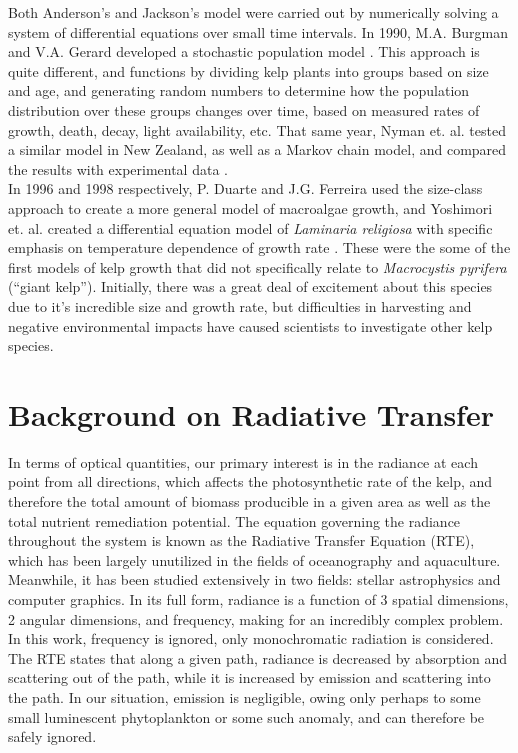 Both Anderson's and Jackson's model were carried out by numerically solving a system of differential equations over small time intervals.
In 1990, M.A. Burgman and V.A. Gerard developed a stochastic population model \cite{burgman_stage-structured_1990}.
This approach is quite different, and functions by dividing kelp plants into groups based on size and age, and generating random numbers to determine how the population distribution over these groups changes over time, based on measured rates of growth, death, decay, light availability, etc.
That same year, Nyman et. al. tested a similar model in New Zealand, as well as a Markov chain model, and compared the results with experimental data \cite{nyman_macrocystis_1990}. \\[-0.75em]

In 1996 and 1998 respectively, P. Duarte and J.G. Ferreira used the size-class approach to create a more general model of macroalgae growth, and Yoshimori et. al. created a differential equation model of \textit{Laminaria religiosa} with specific emphasis on temperature dependence of growth rate \cite{duarte_model_1997,yoshimori_mathematical_1998}.
These were the some of the first models of kelp growth that did not specifically relate to \textit{Macrocystis pyrifera} (``giant kelp''). 
Initially, there was a great deal of excitement about this species due to it's incredible size and growth rate, but difficulties in harvesting and negative environmental impacts have caused scientists to investigate other kelp species. \\[-0.75em]

\section{Background on Radiative Transfer}
In terms of optical quantities, our primary interest is in the radiance at each point from all directions, which affects the photosynthetic rate of the kelp, and therefore the total amount of biomass producible in a given area as well as the total nutrient remediation potential.
The equation governing the radiance throughout the system is known as the Radiative Transfer Equation (RTE), which has been largely unutilized in the fields of oceanography and aquaculture.
Meanwhile, it has been studied extensively in two fields: stellar astrophysics and computer graphics.
In its full form, radiance is a function of 3 spatial dimensions, 2 angular dimensions, and frequency, making for an incredibly complex problem.
In this work, frequency is ignored, only monochromatic radiation is considered.
The RTE states that along a given path, radiance is decreased by absorption and scattering out of the path, while it is increased by emission and scattering into the path.
In our situation, emission is negligible, owing only perhaps to some small luminescent phytoplankton or some such anomaly, and can therefore be safely ignored.

